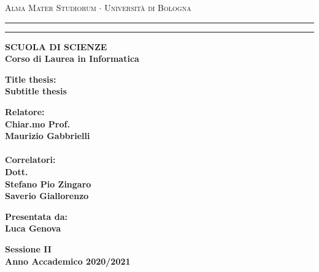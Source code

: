\documentclass[12pt,a4paper]{report}
\begin{document}
\begin{titlepage}
\begin{center}
{{\Large{\textsc{Alma Mater Studiorum $\cdot$ Universit\`a di
Bologna}}}} \rule[0.1cm]{15.8cm}{0.1mm}
\rule[0.5cm]{15.8cm}{0.6mm}
{\small{\bf SCUOLA DI SCIENZE\\
Corso di Laurea in Informatica }}
\end{center}
\vspace{15mm}

\begin{center}
{\LARGE{\bf Title thesis:}}\\
\vspace{3mm}
{\LARGE{\bf Subtitle thesis}}\\
\end{center}
\vspace{40mm}
\par
\noindent
\begin{minipage}[t]{0.47\textwidth}
{\large{\bf Relatore:\\
Chiar.mo Prof.\\
Maurizio Gabbrielli\\
\\
Correlatori:\\
Dott.\\
Stefano Pio Zingaro\\
Saverio Giallorenzo\\
}}
\end{minipage}
\hfill
\begin{minipage}[t]{0.47\textwidth}\raggedleft
{\large{\bf Presentata da:\\
Luca Genova}}
\end{minipage}
\vspace{20mm}
\begin{center}
{\large{\bf Sessione II\\%
Anno Accademico 2020/2021}}%
\end{center}
\end{titlepage}

\tableofcontents
\end{document}
